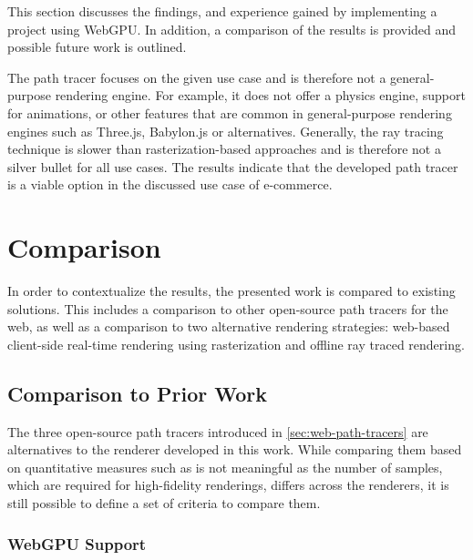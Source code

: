 
This section discusses the findings, and experience gained by implementing a project using \gls{WebGPU}. In addition, a comparison of the results is provided and possible future work is outlined.

The path tracer focuses on the given use case and is therefore not a general-purpose rendering engine. For example, it does not offer a physics engine, support for animations, or other features that are common in general-purpose rendering engines such as \gls{Three.js}, \gls{Babylon.js} or alternatives. Generally, the ray tracing technique is slower than rasterization-based approaches and is therefore not a silver bullet for all use cases. The results indicate that the developed path tracer is a viable option in the discussed use case of e-commerce.

\section{Comparison}

In order to contextualize the results, the presented work is compared to existing solutions. This includes a comparison to other open-source path tracers for the web, as well as a comparison to two alternative rendering strategies: web-based client-side real-time rendering using rasterization and offline ray traced rendering.

\subsection*{Comparison to Prior Work}
\label{sec:comparisonToPriorWork}

The three open-source path tracers introduced in \autoref{sec:web-path-tracers} are alternatives to the renderer developed in this work. While comparing them based on quantitative measures such as  is not meaningful as the number of samples, which are required for high-fidelity renderings, differs across the renderers, it is still possible to define a set of criteria to compare them.


\subsubsection*{WebGPU Support}

